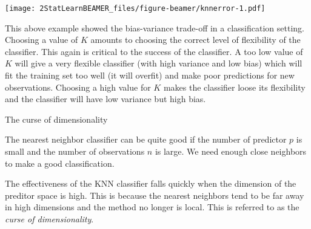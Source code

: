 \documentclass[ignorenonframetext,]{beamer}
\begin{document}
\begin{frame}

\texttt{[image: 2StatLearnBEAMER\_files/figure-beamer/knnerror-1.pdf]}

\end{frame}

\begin{frame}

This above example showed the bias-variance trade-off in a
classification setting. Choosing a value of \(K\) amounts to choosing
the correct level of flexibility of the classifier. This again is
critical to the success of the classifier. A too low value of \(K\) will
give a very flexible classifier (with high variance and low bias) which
will fit the training set too well (it will overfit) and make poor
predictions for new observations. Choosing a high value for \(K\) makes
the classifier loose its flexibility and the classifier will have low
variance but high bias.

\end{frame}

\begin{frame}

\begin{block}{The curse of dimensionality}

The nearest neighbor classifier can be quite good if the number of
predictor \(p\) is small and the number of observations \(n\) is large.
We need enough close neighbors to make a good classification.

The effectiveness of the KNN classifier falls quickly when the dimension
of the preditor space is high. This is because the nearest neighbors
tend to be far away in high dimensions and the method no longer is
local. This is referred to as the \emph{curse of dimensionality}.

\end{block}

\end{frame}
\end{document}
